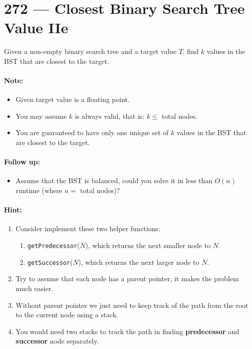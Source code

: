 \section{272 --- Closest Binary Search Tree Value IIe}
Given a non-empty binary search tree and a target value $T$, find $k$ values in the BST that are closest to the target.

\paragraph{Note:}

\begin{itemize}
\item Given target value is a floating point.
\item You may assume $k$ is always valid, that is: $k \leq$ total nodes.
\item You are guaranteed to have only one unique set of $k$ values in the BST that are closest to the target.
\end{itemize}
 
\paragraph{Follow up:}
\begin{itemize}
\item Assume that the BST is balanced, could you solve it in less than $O(n)$ runtime (where $n =$ total nodes)?
\end{itemize}

\paragraph{Hint:}

\begin{enumerate}
\item Consider implement these two helper functions:
\begin{enumerate}
\item \texttt{getPredecessor}($N$), which returns the next smaller node to $N$.
\item \texttt{getSuccessor}($N$), which returns the next larger node to $N$.
\end{enumerate}
\item Try to assume that each node has a parent pointer, it makes the problem much easier.
\item Without parent pointer we just need to keep track of the path from the root to the current node using a stack.
\item You would need two stacks to track the path in finding \textbf{predecessor} and \textbf{successor} node separately.
\end{enumerate}
